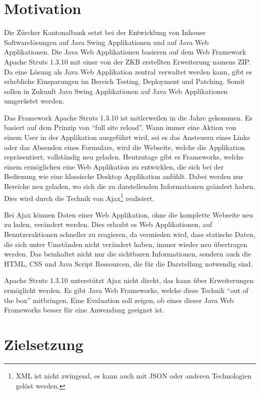   \section{Motivation}
  
  Die Zürcher Kantonalbank setzt bei der Entwicklung von Inhouse
  Softwarelösungen auf Java Swing Applikationen und auf Java Web Applikationen.
  Die Java Web Applikationen basieren auf dem Web Framework Apache Struts
  1.3.10 mit einer von der ZKB erstellten Erweiterung namens \ac{ZIP}. Da eine
  Lösung als Java Web Applikation zentral verwaltet werden kann, gibt es
  erhebliche Einsparungen im Bereich Testing, Deployment und Patching. Somit
  sollen in Zukunft Java Swing Applikationen auf Java Web Applikationen
  umgerüstet werden.
  
  Das Framework Apache Struts 1.3.10 ist mitlerweilen in die Jahre gekommen. Es
  basiert auf dem Prinzip von ``full site reload''. Wann immer eine Aktion
  von einem User in der Applikation ausgeführt wird, sei es das Ansteuern eines
  Links oder das Absenden eines Formulars, wird die Webseite, welche die
  Applikation repräsentiert, vollständig neu geladen. Heutzutage gibt es
  Frameworks, welche einem ermöglichen eine Web Applikation zu entwicklen, die
  sich bei der Bedienung wie eine klassische Desktop Applikation anfühlt. Dabei
  werden nur Bereiche neu geladen, wo sich die zu darstellenden Informationen
  geändert haben. Dies wird durch die Technik von \ac{Ajax}\footnote{XML ist
  nicht zwingend, es kann auch mit JSON oder anderen Technologien gelöst
  werden.} realisiert.
  
  Bei \ac{Ajax} können Daten einer Web Applikation, ohne die komplette Webseite
  neu zu laden, verändert werden. Dies erlaubt es Web Applikationen, auf
  Benutzeraktionen schneller zu reagieren, da vermieden wird, dass statische
  Daten, die sich unter Umständen nicht verändert haben, immer wieder neu
  übertragen werden. Das beinhaltet nicht nur die sichtbaren Informationen,
  sondern auch die \ac{HTML}, \ac{CSS} und Java Script Ressourcen, die für die
  Darstellung notwendig sind.
  
  Apache Struts 1.3.10 unterstützt \ac{Ajax} nicht direkt, das kann über
  Erweiterungen ermöglicht werden. Es gibt Java Web Frameworks, welche diese
  Technik ``out of the box'' mitbringen. Eine Evaluation soll zeigen, ob eines
  dieser Java Web Frameworks besser für eine Anwendung geeignet ist.
  
  \clearpage
  
  \section{Zielsetzung}
  
